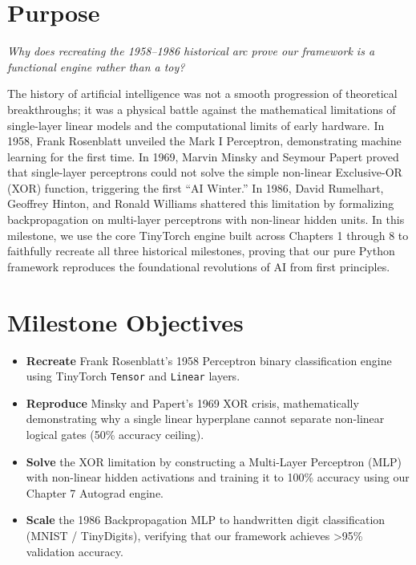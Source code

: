 \documentclass[
  letterpaper,
]{scrbook}
\providecommand{\tightlist}{%
  \setlength{\itemsep}{0pt}\setlength{\parskip}{0pt}}
\begin{document}

\section*{Purpose}\label{purpose-9}


\emph{Why does recreating the 1958--1986 historical arc prove our
framework is a functional engine rather than a toy?}

The history of artificial intelligence was not a smooth progression of
theoretical breakthroughs; it was a physical battle against the
mathematical limitations of single-layer linear models and the
computational limits of early hardware. In 1958, Frank Rosenblatt
unveiled the Mark I Perceptron, demonstrating machine learning for the
first time. In 1969, Marvin Minsky and Seymour Papert proved that
single-layer perceptrons could not solve the simple non-linear
Exclusive-OR (XOR) function, triggering the first ``AI Winter.'' In
1986, David Rumelhart, Geoffrey Hinton, and Ronald Williams shattered
this limitation by formalizing backpropagation on multi-layer
perceptrons with non-linear hidden units. In this milestone, we use the
core TinyTorch engine built across Chapters 1 through 8 to faithfully
recreate all three historical milestones, proving that our pure Python
framework reproduces the foundational revolutions of AI from first
principles.

\section*{Milestone Objectives}\label{milestone-objectives}


\begin{itemize}
\tightlist
\item
  \textbf{Recreate} Frank Rosenblatt's 1958 Perceptron binary
  classification engine using TinyTorch \texttt{Tensor} and
  \texttt{Linear} layers.
\item
  \textbf{Reproduce} Minsky and Papert's 1969 XOR crisis, mathematically
  demonstrating why a single linear hyperplane cannot separate
  non-linear logical gates (50\% accuracy ceiling).
\item
  \textbf{Solve} the XOR limitation by constructing a Multi-Layer
  Perceptron (MLP) with non-linear hidden activations and training it to
  100\% accuracy using our Chapter 7 Autograd engine.
\item
  \textbf{Scale} the 1986 Backpropagation MLP to handwritten digit
  classification (MNIST / TinyDigits), verifying that our framework
  achieves \textgreater95\% validation accuracy.
\end{itemize}
\end{document}
